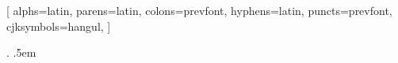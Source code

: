 

\usepackage{graphicx} %

\usepackage{amsmath,amssymb,amsthm} %
\usepackage{mathrsfs} %
\usepackage{mathtools} %
\usepackage{tikz} %
\usepackage{tikz-cd} %
\usepackage{mdframed} %
\usepackage{physics} %
\usepackage{halloweenmath} %
\usepackage{xcolor}

\usepackage{enumitem} %
\renewcommand{\labelenumi}{(\theenumi)}

\usepackage{hyperref} %
\usepackage{fancyhdr} %
\usepackage{setspace} %

\usepackage[utf8]{inputenc}
\usepackage[autolanguage]{numprint}
\usepackage[hangul]{kotex}

[
    alphs=latin,
    parens=latin,
    colons=prevfont,
    hyphens=latin,
    puncts=prevfont,
    cjksymbols=hangul,
]


\newcommand{\termTheorem}{정리\rmfamily}
\newcommand{\termAxiom}{공리\rmfamily}
\newcommand{\termProposition}{명제\rmfamily}
\newcommand{\termLemma}{보조정리\rmfamily}
\newcommand{\termConjecture}{추측\rmfamily}
\newcommand{\termCorollary}{따름정리\rmfamily}
\newcommand{\termDefinition}{정의\rmfamily}
\newcommand{\termProblem}{문제\rmfamily}
\newcommand{\termSolution}{풀이\rmfamily}
\newcommand{\termExample}{예\rmfamily}
\newcommand{\termRemark}{\normalfont 주\rmfamily}
\newcommand{\termNote}{\normalfont 노트\rmfamily}
\newcommand{\termProof}{\normalfont 증명\rmfamily}


\DeclarePairedDelimiter{\ceil}{\lceil}{\rceil}
\DeclarePairedDelimiter{\floor}{\lfloor}{\rfloor}

\newcommand{\SetR}{\mathbb{R}}
\newcommand{\SetQ}{\mathbb{Q}}
\newcommand{\SetZ}{\mathbb{Z}}
\newcommand{\SetN}{\mathbb{N}}
\newcommand{\SetC}{\mathbb{C}}
\newcommand{\SetF}{\mathbb{F}}

{}%
{}%
{\upshape}%
{}%
{\bfseries}%
{.}%
{.5em}%
{}%


